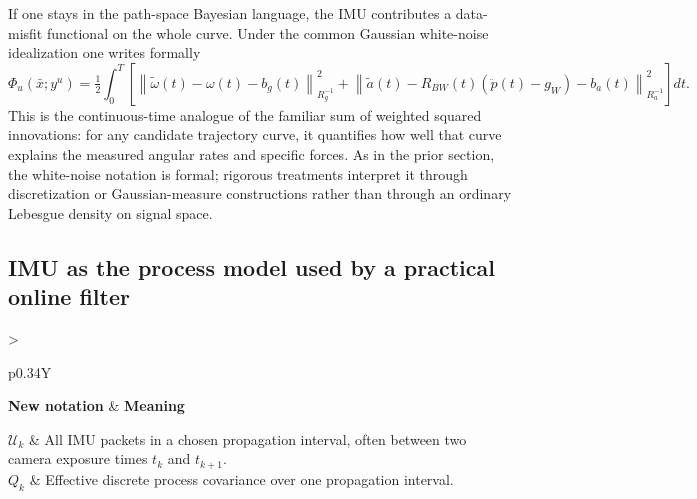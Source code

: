 \documentclass[11pt]{report}
\newcommand{\norm}[1]{\left\lVert #1 \right\rVert}
\newcommand{\Half}{\tfrac12}
\newcommand{\NotationTable}[1]{%
\vspace{0.6mm}
{\scriptsize
\setlength{\tabcolsep}{2.5pt}
\begin{tabularx}{\columnwidth}{>{\raggedright\arraybackslash}p{0.34\columnwidth}Y}
\toprule
\textbf{New notation} & \textbf{Meaning}\\
\midrule
#1\\
\bottomrule
\end{tabularx}}
\vspace{0.8mm}}
\begin{document}
If one stays in the path-space Bayesian language, the IMU contributes a data-misfit functional on the whole curve. Under the common Gaussian white-noise idealization one writes formally
\begin{equation}
\Phi_u(\bar x;y^u)=\Half\int_0^T\left[\norm{\widetilde\omega(t)-\omega(t)-b_g(t)}_{R_g^{-1}}^2+\norm{\widetilde a(t)-R_{BW}(t)(\ddot p(t)-g_W)-b_a(t)}_{R_a^{-1}}^2\right]dt.
\label{eq:imu_curve_likelihood}
\end{equation}
This is the continuous-time analogue of the familiar sum of weighted squared innovations: for any candidate trajectory curve, it quantifies how well that curve explains the measured angular rates and specific forces. As in the prior section, the white-noise notation is formal; rigorous treatments interpret it through discretization or Gaussian-measure constructions rather than through an ordinary Lebesgue density on signal space.

\subsection{IMU as the process model used by a practical online filter}
\NotationTable{
$\mathcal U_k$ & All IMU packets in a chosen propagation interval, often between two camera exposure times $t_k$ and $t_{k+1}$.\\
$Q_k$ & Effective discrete process covariance over one propagation interval.}
\end{document}
